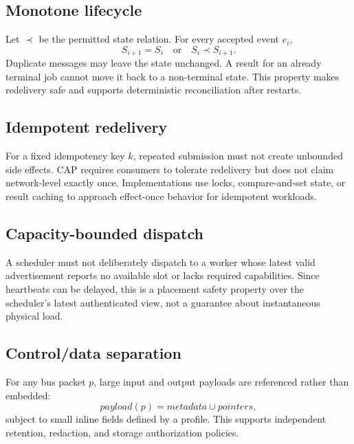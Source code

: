 \subsection{Monotone lifecycle}

Let $\prec$ be the permitted state relation. For every accepted event $e_i$,
\begin{equation}
  S_{i+1} = S_i \quad \text{or} \quad S_i \prec S_{i+1}.
\end{equation}
Duplicate messages may leave the state unchanged. A result for an already terminal job cannot move it back to a non-terminal state. This property makes redelivery safe and supports deterministic reconciliation after restarts.

\subsection{Idempotent redelivery}

For a fixed idempotency key $k$, repeated submission must not create unbounded side effects. CAP requires consumers to tolerate redelivery but does not claim network-level exactly once. Implementations use locks, compare-and-set state, or result caching to approach effect-once behavior for idempotent workloads.

\subsection{Capacity-bounded dispatch}

A scheduler must not deliberately dispatch to a worker whose latest valid advertisement reports no available slot or lacks required capabilities. Since heartbeats can be delayed, this is a placement safety property over the scheduler's latest authenticated view, not a guarantee about instantaneous physical load.

\subsection{Control/data separation}

For any bus packet $p$, large input and output payloads are referenced rather than embedded:
\begin{equation}
  payload(p) = metadata \cup pointers,
\end{equation}
subject to small inline fields defined by a profile. This supports independent retention, redaction, and storage authorization policies.
